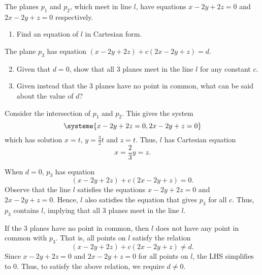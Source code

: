 \begin{problem}
    The planes $p_1$ and $p_2$, which meet in line $l$, have equations $x - 2y + 2z = 0$ and $2x - 2y + z = 0$ respectively.

    \begin{enumerate}
        \item Find an equation of $l$ in Cartesian form.
    \end{enumerate}

    The plane $p_3$ has equation $(x-2y+2z) + c(2x-2y+z) = d$.

    \begin{enumerate}
        \setcounter{enumi}{1}
        \item Given that $d = 0$, show that all 3 planes meet in the line $l$ for any constant $c$.
        \item Given instead that the 3 planes have no point in common, what can be said about the value of $d$?
    \end{enumerate}
\end{problem}
\begin{solution}
    \begin{ppart}
        Consider the intersection of $p_1$ and $p_2$. This gives the system \[\systeme{
                x-2y+2z=0,
                2x-2y+z=0
        }\] which has solution $x = t$, $y = \frac32 t$ and $z = t$. Thus, $l$ has Cartesian equation \[x = \frac23 y = z.\]
    \end{ppart}
    \begin{ppart}
        When $d = 0$, $p_3$ has equation \[(x-2y+2z) + c(2x-2y+z) = 0.\] Observe that the line $l$ satisfies the equations $x-2y+2z = 0$ and $2x-2y+z = 0$. Hence, $l$ also satisfies the equation that gives $p_3$ for all $c$. Thus, $p_3$ contains $l$, implying that all 3 planes meet in the line $l$.
    \end{ppart}
    \begin{ppart}
        If the 3 planes have no point in common, then $l$ does not have any point in common with $p_3$. That is, all points on $l$ satisfy the relation \[(x-2y+2z) + c(2x-2y+z) \neq d.\] Since $x - 2y + 2z = 0$ and $2x - 2y + z = 0$ for all points on $l$, the LHS simplifies to 0. Thus, to satisfy the above relation, we require $d \neq 0$.
    \end{ppart}
\end{solution}

